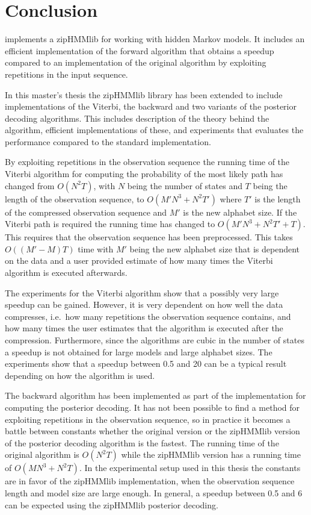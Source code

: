 
\chapter{Conclusion}
\label{cha:conclusion}

\citet{sand2013ziphmmlib} implements a zipHMMlib for working with hidden Markov
models. It includes an efficient implementation of the forward algorithm that
obtains a speedup compared to an implementation of the original algorithm by
exploiting repetitions in the input sequence.

In this master's thesis the zipHMMlib library has been extended to include
implementations of the Viterbi, the backward and two variants of the posterior
decoding algorithms. This includes description of the theory behind the
algorithm, efficient implementations of these, and experiments that evaluates
the performance compared to the standard implementation.

By exploiting repetitions in the observation sequence the running time of the
Viterbi algorithm for computing the probability of the most likely path has
changed from $O(N^2 T)$, with $N$ being the number of states and $T$ being the
length of the observation sequence, to $O(M' N^3 + N^2 T')$ where $T'$ is the
length of the compressed observation sequence and $M'$ is the new alphabet
size. If the Viterbi path is required the running time has changed to
$O(M' N^3 + N^2 T' + T)$. This requires that the observation sequence has been
preprocessed. This takes $O((M' - M) T)$ time with $M'$ being the new alphabet size
that is dependent on the data and a user provided estimate of how many times
the Viterbi algorithm is executed afterwards.

The experiments for the Viterbi algorithm show that a possibly very large speedup can be gained. However,
it is very dependent on how well the data compresses, i.e.\ how many repetitions
the observation sequence contains, and how many times the user estimates that the
algorithm is executed after the compression. Furthermore, since the
algorithms are cubic in the number of states a speedup is not obtained for
large models and large alphabet sizes. The experiments show that a speedup
between 0.5 and 20 can be a typical result depending on how the algorithm is used.

The backward algorithm has been implemented as part of the implementation for
computing the posterior decoding. It has not been possible to find a method for
exploiting repetitions in the observation sequence, so in practice it becomes a
battle between constants whether the original version or the zipHMMlib version
of the posterior decoding algorithm is the fastest. The running time of the
original algorithm is $O(N^2 T)$ while the zipHMMlib version has a running time
of $O(MN^3 + N^2 T)$. In the experimental setup used in this thesis the
constants are in favor of the zipHMMlib implementation, when the observation
sequence length and model size are large enough. In general, a speedup between
0.5 and 6 can be expected using the zipHMMlib posterior decoding.

